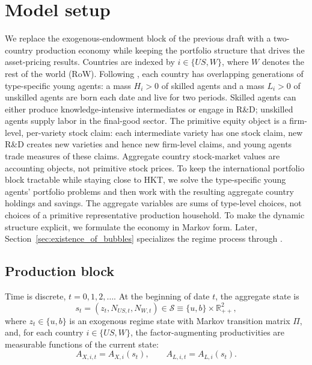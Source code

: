 \documentclass{article}
\begin{document}
{
\maketitle
}

\section{Model setup}

We replace the exogenous-endowment block of the previous draft with a two-country production economy while keeping the portfolio structure that drives the asset-pricing results. Countries are indexed by $i\in\{US,W\}$, where $W$ denotes the rest of the world (RoW). Following \citet{hirano2025technological}, each country has overlapping generations of type-specific young agents: a mass $H_i>0$ of skilled agents and a mass $L_i>0$ of unskilled agents are born each date and live for two periods. Skilled agents can either produce knowledge-intensive intermediates or engage in R\&D; unskilled agents supply labor in the final-good sector. The primitive equity object is a firm-level, per-variety stock claim: each intermediate variety has one stock claim, new R\&D creates new varieties and hence new firm-level claims, and young agents trade measures of these claims. Aggregate country stock-market values are accounting objects, not primitive stock prices. To keep the international portfolio block tractable while staying close to HKT, we solve the type-specific young agents' portfolio problems and then work with the resulting aggregate country holdings and savings. The aggregate variables are sums of type-level choices, not choices of a primitive representative production household. To make the dynamic structure explicit, we formulate the economy in Markov form. Later, Section~\ref{sec:existence_of_bubbles} specializes the regime process through .

\subsection{Production block}

\begin{ass}\label{ass_recursive_state}
Time is discrete, $t=0,1,2,\ldots$. At the beginning of date $t$, the aggregate state is
\[
s_t=(z_t,N_{US,t},N_{W,t})\in\mathcal S\equiv \{u,b\}\times\mathbb R_{++}^2,
\]
where $z_t\in\{u,b\}$ is an exogenous regime state with Markov transition matrix $\Pi$, and, for each country $i\in\{US,W\}$, the factor-augmenting productivities are measurable functions of the current state:
\[
A_{X,i,t}=A_{X,i}(s_t),
\qquad
A_{L,i,t}=A_{L,i}(s_t).
\]
\end{ass}
\end{document}
